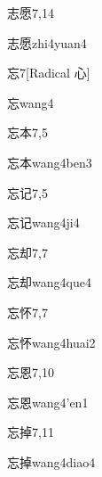 \begin{entry}{志愿}{7,14}
  \begin{phonetics}{志愿}{zhi4yuan4}
  \end{phonetics}
\end{entry}

\begin{entry}{忘}{7}[Radical 心]
  \begin{phonetics}{忘}{wang4}
  \end{phonetics}
\end{entry}

\begin{entry}{忘本}{7,5}
  \begin{phonetics}{忘本}{wang4ben3}
  \end{phonetics}
\end{entry}

\begin{entry}{忘记}{7,5}
  \begin{phonetics}{忘记}{wang4ji4}
  \end{phonetics}
\end{entry}

\begin{entry}{忘却}{7,7}
  \begin{phonetics}{忘却}{wang4que4}
  \end{phonetics}
\end{entry}

\begin{entry}{忘怀}{7,7}
  \begin{phonetics}{忘怀}{wang4huai2}
  \end{phonetics}
\end{entry}

\begin{entry}{忘恩}{7,10}
  \begin{phonetics}{忘恩}{wang4'en1}
  \end{phonetics}
\end{entry}

\begin{entry}{忘掉}{7,11}
  \begin{phonetics}{忘掉}{wang4diao4}
  \end{phonetics}
\end{entry}

